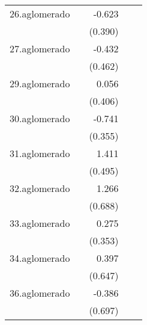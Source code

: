 {\begin{longtable}{l*{4}{D{.}{.}{-1}}}
\addlinespace
26.aglomerado&                     &      -0.623         &                     &                     \\
            &                     &     (0.390)         &                     &                     \\
\addlinespace
27.aglomerado&                     &      -0.432         &                     &                     \\
            &                     &     (0.462)         &                     &                     \\
\addlinespace
29.aglomerado&                     &       0.056         &                     &                     \\
            &                     &     (0.406)         &                     &                     \\
\addlinespace
30.aglomerado&                     &      -0.741\sym{*}  &                     &                     \\
            &                     &     (0.355)         &                     &                     \\
\addlinespace
31.aglomerado&                     &       1.411\sym{**} &                     &                     \\
            &                     &     (0.495)         &                     &                     \\
\addlinespace
32.aglomerado&                     &       1.266         &                     &                     \\
            &                     &     (0.688)         &                     &                     \\
\addlinespace
33.aglomerado&                     &       0.275         &                     &                     \\
            &                     &     (0.353)         &                     &                     \\
\addlinespace
34.aglomerado&                     &       0.397         &                     &                     \\
            &                     &     (0.647)         &                     &                     \\
\addlinespace
36.aglomerado&                     &      -0.386         &                     &                     \\
            &                     &     (0.697)         &                     &                     \\

\end{longtable}}
